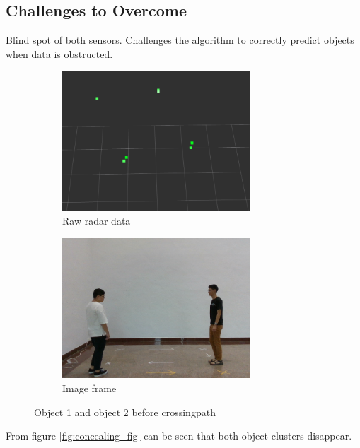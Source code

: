 \subsection{Challenges to Overcome}\label{sec:3-challenge}
Blind spot of both sensors.
Challenges the algorithm to correctly predict objects when data is obstructed.

\begin{figure}[!htb]
    \centering
    \begin{subfigure}{0.3\linewidth}
        \includegraphics[width=7cm]{Figures/before_conceal_radar.png}
        \caption{Raw radar data}
        \label{subfig:before_conceal_radar_fig}
    \end{subfigure}
    \hspace{0.15\textwidth}
    \begin{subfigure}{0.3\linewidth}
        \includegraphics[width=7cm]{Figures/before_conceal_image.png}
        \caption{Image frame}
        \label{subfig:before_conceal_image_fig}
    \end{subfigure}

    \caption{Object 1 and object 2 before crossingpath}
    \label{fig:before_conceal_fig}
\end{figure}

From figure \ref*{fig:concealing_fig} can be seen that both object clusters disappear.



